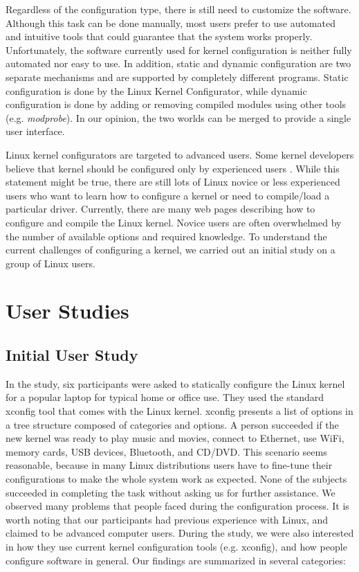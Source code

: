\documentclass{chi2009}
\begin{document}
Regardless of the configuration type, there is still need to customize the software. Although this task can be done manually, most users prefer to use automated
and intuitive tools that could guarantee that the system works properly. Unfortunately, the software currently used for kernel configuration is neither fully
automated nor easy to use. In addition, static and dynamic configuration are two separate mechanisms and are supported by completely different programs. Static
configuration is done by the Linux Kernel Configurator, while dynamic configuration is done by adding or removing compiled modules using other tools (e.g.
\textit{modprobe}). In our opinion, the two worlds can be merged to provide a single user interface.

Linux kernel configurators are targeted to advanced users. Some kernel developers believe that kernel should be configured only by experienced users
\cite{kernel:aunt:2002}. While this statement might be true, there are still lots of Linux novice or less experienced users who want to learn how to configure a
kernel or need to compile/load a particular driver. Currently, there are many web pages describing how to configure and compile the Linux kernel. Novice users
are often overwhelmed by the number of available options and required knowledge. To understand the current challenges of configuring a kernel, we carried out an
initial study on a group of Linux users.

\section{User Studies}\label{sec:userstudies}

\subsection{Initial User Study}
In the study, six participants were asked to statically configure the Linux kernel for a popular laptop for typical home or office use. They used the standard
\textsf{xconfig} tool that comes with the Linux kernel. \textsf{xconfig} presents a list of options in a tree structure composed of categories and options. A
person succeeded if the new kernel was ready to play music and movies, connect to Ethernet, use WiFi, memory cards, USB devices, Bluetooth, and CD/DVD. This
scenario seems reasonable, because in many Linux distributions users have to fine-tune their configurations to make the whole system work as expected. None
of the subjects succeeded in completing the task without asking us for further assistance. We observed many problems that people faced during the configuration
process. It is worth noting that our participants had previous experience with Linux, and claimed to be advanced computer users. During the study, we were also
interested in how they use current kernel configuration tools (e.g. \textsf{xconfig}), and how people configure software in general. Our findings are summarized
in several categories:
\end{document}
